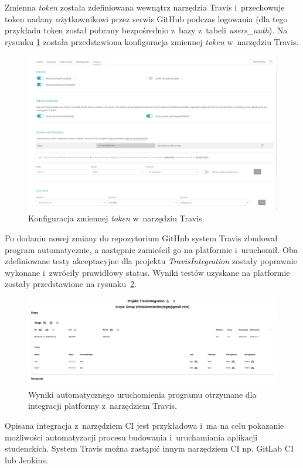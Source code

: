 Zmienna \textit{token} została zdefiniowana wewnątrz narzędzia Travis i~przechowuje token nadany użytkownikowi przez serwis GitHub podczas logowania (dla tego przykładu token został pobrany bezpośrednio z~bazy z~tabeli \textit{users\_auth}).
Na rysunku \ref{fig:travis_integration_internal} została przedstawiona konfiguracja zmiennej \textit{token} w~narzędziu Travis.

\begin{figure}[h]
    \centering
    \includegraphics[width = 16cm]{chapter05/travis_integration_internal.png}
    \caption{Konfiguracja zmiennej \textit{token} w~narzędziu Travis.}
    \label{fig:travis_integration_internal}
\end{figure}

Po dodaniu nowej zmiany do repozytorium GitHub system Travis zbudował program automatycznie, a następnie zamieścił go na platformie i~uruchomił.
Oba zdefiniowane testy akceptacyjne dla projektu \textit{TravisIntegration} zostały poprawnie wykonane i~zwróciły prawidłowy status.
Wyniki testów uzyskane na platformie zostały przedstawione na rysunku~\ref{fig:travis_integration_result}.

\begin{figure}[h]
    \centering
    \includegraphics[width = 16cm]{chapter05/travis_integration_result.png}
    \caption{Wyniki automatycznego uruchomienia programu otrzymane dla integracji platformy z~narzędziem Travis.}
    \label{fig:travis_integration_result}
\end{figure}

Opisana integracja z~narzędziem CI jest przykładowa i~ma na celu pokazanie możliwości automatyzacji procesu budowania i~uruchamiania aplikacji studenckich.
System Travis można zastąpić innym narzędziem CI np. GitLab CI lub Jenkins.